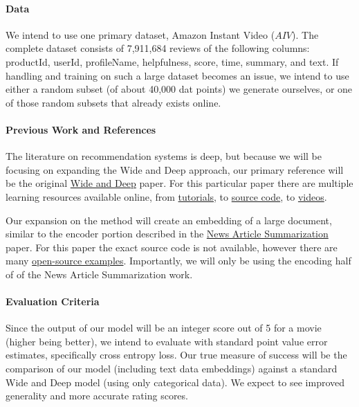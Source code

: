 \documentclass[preprint,10.5pt]{article}
\begin{document}
\paragraph{Data} We intend to use one primary dataset, Amazon Instant Video ($AIV$). The complete dataset consists of 7,911,684 reviews of the following columns: productId, userId, profileName, helpfulness, score, time, summary, and text. If handling and training on such a large dataset becomes an issue, we intend to use either a random subset (of about 40,000 dat points) we generate ourselves, or one of those random subsets that already exists online.

\paragraph{Previous Work and References} The literature on recommendation systems is deep, but because we will be focusing on expanding the Wide and Deep approach, our primary reference will be the original \href{https://www.tensorflow.org/tutorials/wide_and_deep}{Wide and Deep} paper. For this particular paper there are multiple learning resources available online, from \href{https://www.tensorflow.org/tutorials/wide_and_deep}{tutorials}, to \href{https://github.com/tensorflow/tensorflow/blob/master/tensorflow/examples/learn/wide_n_deep_tutorial.py}{source code}, to \href{https://www.youtube.com/watch?v=NV1tkZ9Lq48}{videos}.
\par Our expansion on the method will create an embedding of a large document, similar to the encoder portion described in the \href{https://web.stanford.edu/class/cs224n/reports/2746634.pdf}{News Article Summarization} paper. For this paper the exact source code is not available, however there are many \href{https://github.com/hengluchang/deep-news-summarization}{open-source examples}. Importantly, we will only be using the encoding half of of the News Article Summarization work.

\paragraph{Evaluation Criteria} Since the output of our model will be an integer score out of 5 for a movie (higher being better), we intend to evaluate with standard point value error estimates, specifically cross entropy loss. Our true measure of success will be the comparison of our model (including text data embeddings) against a standard Wide and Deep model (using only categorical data). We expect to see improved generality and more accurate rating scores.
\end{document}
